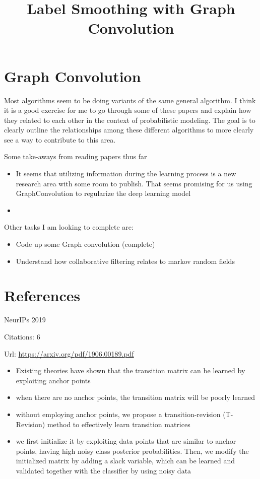 \documentclass[11pt]{article}
\title{Label Smoothing with Graph Convolution}
\author{}
\date{}
\begin{document}
\maketitle

\section{Graph Convolution}

Most algorithms seem to be doing variants of the same general algorithm. I think it is a good exercise for me to go through some of these papers and explain how they related to each other in the context of probabilistic modeling. The goal is to clearly outline the relationships among these different algorithms to more clearly see a way to contribute to this area.

\vspace{2cm}
\noindent Some take-aways from reading papers thus far
\begin{itemize}
\item It seems that utilizing information during the learning process is a new research area with some room to publish. That seems promising for us using GraphConvolution to regularize the deep learning model
\item 
\end{itemize}

\vspace{2cm}
\noindent Other tasks I am looking to complete are:
\begin{itemize}
\item Code up some Graph convolution (complete)
\item Understand how collaborative filtering relates to markov random fields
\end{itemize}

\newpage

\section{References}

\noindent NeurIPs 2019

\noindent Citations: 6

\noindent Url: \url{https://arxiv.org/pdf/1906.00189.pdf}

\begin{itemize}
   \item Existing theories have shown that the transition matrix can be learned by exploiting anchor points
   \item when there are no anchor points, the transition matrix will be poorly learned
   \item without employing anchor points, we propose a transition-revision (T-Revision) method to effectively learn transition matrices
   \item we first initialize it by exploiting data points that are similar to anchor points, having high noisy class posterior probabilities. Then, we modify the initialized matrix by adding a slack variable, which can be learned and validated together with the classifier by using noisy data
\end{itemize}
\end{document}
